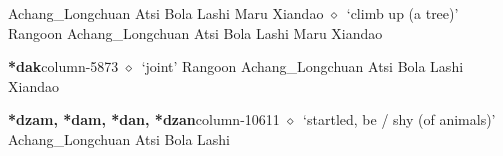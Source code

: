 \hspace{1ex}
         Achang\_Longchuan 
\hspace{1ex}
         Atsi 
\hspace{1ex}
         Bola 
\hspace{1ex}
         Lashi 
\hspace{1ex}
         Maru 
\hspace{1ex}
         Xiandao 
\hspace{1ex}
         $\diamond$~`climb up (a tree)'
         Rangoon 
\hspace{1ex}
         Achang\_Longchuan 
\hspace{1ex}
         Atsi 
\hspace{1ex}
         Bola 
\hspace{1ex}
         Lashi 
\hspace{1ex}
         Maru 
\hspace{1ex}
         Xiandao 
  \item {\footnotesize \textbf{*dak}}{\tiny column-5873}
         $\diamond$~`joint'
         Rangoon 
\hspace{1ex}
         Achang\_Longchuan 
\hspace{1ex}
         Atsi 
\hspace{1ex}
         Bola 
\hspace{1ex}
         Lashi 
\hspace{1ex}
         Xiandao 
  \item {\footnotesize \textbf{*dzam, *dam, *dan, *dzan}}{\tiny column-10611}
         $\diamond$~`startled, be / shy (of animals)'
         Achang\_Longchuan 
\hspace{1ex}
         Atsi 
\hspace{1ex}
         Bola 
\hspace{1ex}
         Lashi 
